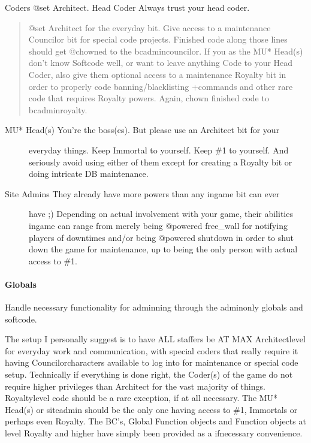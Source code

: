 \documentclass[letterpaper,10pt,english]{sphinxmanual}
\begin{document}
\sphinxAtStartPar
Coders        \sphinxhyphen{} @set Architect.
Head Coder    \sphinxhyphen{} Always trust your head coder.
\begin{quote}

\sphinxAtStartPar
@set Architect for the everyday bit. Give access to a
maintenance Councilor bit for special code projects. Finished
code along those lines should get @chowned to the
bc\sphinxhyphen{}admin\sphinxhyphen{}councilor.
If you as the MU* Head(s) don’t know Softcode well, or want to
leave anything Code to your Head Coder, also give them optional
access to a maintenance Royalty bit in order to properly code
banning/blacklisting +commands and other rare code that requires
Royalty powers. Again, chown finished code to bc\sphinxhyphen{}admin\sphinxhyphen{}royalty.
\end{quote}
\begin{description}
\item[{MU* Head(s)   \sphinxhyphen{} You’re the boss(es). But please use an Architect bit for your}] \leavevmode
\sphinxAtStartPar
everyday things. Keep Immortal to yourself. Keep \#1 to yourself.
And seriously avoid using either of them except for creating
a Royalty bit or doing intricate DB maintenance.

\item[{Site Admins   \sphinxhyphen{} They already have more powers than any in\sphinxhyphen{}game bit can ever}] \leavevmode
\sphinxAtStartPar
have ;)
Depending on actual involvement with your game, their abilities
in\sphinxhyphen{}game can range from merely being @powered free\_wall for
notifying players of downtimes and/or being @powered shutdown in
order to shut down the game for maintenance, up to being the
only person with actual access to \#1.

\end{description}


\paragraph{Globals}
\label{\detokenize{gettingstarted:globals}}
\sphinxAtStartPar
Handle necessary functionality for adminning through the admin\sphinxhyphen{}only globals and
softcode.

\sphinxAtStartPar
The setup I personally suggest is to have ALL staffers be AT MAX Architect\sphinxhyphen{}level
for everyday work and communication, with special coders that \sphinxhyphen{}really\sphinxhyphen{} require
it having Councilor\sphinxhyphen{}characters available to log into for maintenance or special
code setup. Technically if everything is done right, the Coder(s) of the game do
not require higher privileges than Architect for the vast majority of things.
Royalty\sphinxhyphen{}level code should be a rare exception, if at all necessary. The MU*
Head(s) or site\sphinxhyphen{}admin should be the only one having access to \#1, Immortals or
perhaps even Royalty. The BC’s, Global Function objects and Function objects at
level Royalty and higher have simply been provided as a if\sphinxhyphen{}necessary convenience.
\end{document}
